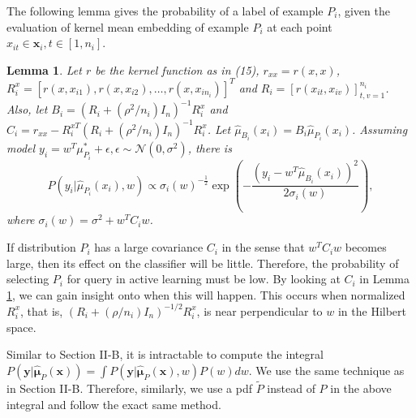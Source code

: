 \documentclass[10pt,twocolumn]{IEEEtran}
\newtheorem{lemma}{Lemma}
\begin{document}
	The following lemma gives the probability of a label of example $P_i$, given the evaluation of kernel mean embedding of example $P_i$ at each point $x_{it} \in \mathbf{x}_i, t \in [1, n_i]$.
	
	\begin{lemma} \label{lem:prob-label-embedding}
		Let $r$ be the kernel function as in (15), $r_{xx} = r(x, x)$, $R_i^x = [r(x, x_{i1}), r(x, x_{i2}), \ldots, r(x, x_{i n_i})]^T$ and $R_i = [r(x_{it}, x_{iv})]_{t,v=1}^{n_i}$. Also, let $B_i = (R_i + (\rho^2 / n_i) I_n)^{-1} R_i^x$ and $C_i = r_{xx} - R_i^{xT} (R_i + (\rho^2 / n_i) I_n)^{-1} R_i^x$. Let $\hat{\mu}_{B_i}(x_i) = B_i \hat{\mu}_{P_i}(x_i)$. Assuming model $y_i = w^T \mu^*_{P_i} + \epsilon, \epsilon \sim \mathcal{N}(0, \sigma^2)$, there is
		\begin{equation}
			P\left(y_i|\hat{\mu}_{P_i}(x_i), w\right) \propto \sigma_i(w)^{-\frac12} \exp\left( -\frac{(y_i - w^T \hat{\mu}_{B_i}(x_i))^2}{2 \sigma_i(w)} \right),
		\end{equation}
		where $\sigma_i(w) = \sigma^2 + w^T C_i w$.
	\end{lemma}
	
	If distribution $P_i$ has a large covariance $C_i$ in the sense that $w^T C_i w$ becomes large, then its effect on the classifier will be little. Therefore, the probability of selecting $P_i$ for query in active learning must be low. By looking at $C_i$ in Lemma \ref{lem:prob-label-embedding}, we can gain insight onto when this will happen. This occurs when normalized $R_i^x$, that is, $(R_i + (\rho/n_i) I_n)^{-1/2} R_i^x$, is near perpendicular to $w$ in the Hilbert space.
	
	Similar to Section II-B, it is intractable to compute the integral $P(\mathbf{y}|\hat{\boldsymbol{\mu}}_P(\mathbf{x})) = \int P(\mathbf{y}|\hat{\boldsymbol{\mu}}_P(\mathbf{x}), w) P(w) dw$. We use the same technique as in Section II-B. Therefore, similarly, we use a pdf $\tilde{P}$ instead of $P$ in the above integral and follow the exact same method.
	
\end{document}
